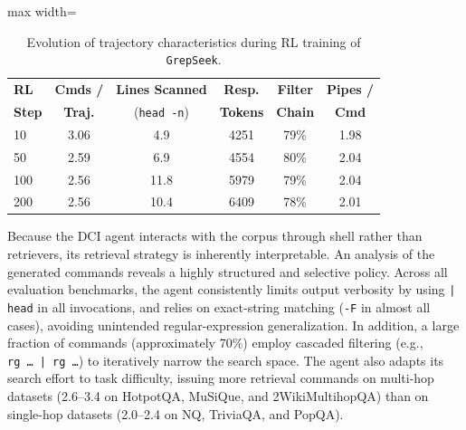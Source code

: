 \documentclass{article} %
\newcommand{\ourmethod}{\texttt{GrepSeek}\xspace}
\begin{document}
\begin{table}
\vspace{-0.8cm} %
\centering
\caption{Evolution of trajectory characteristics during RL training of \ourmethod{}. }
\small
\setlength{\tabcolsep}{2.5pt}
\begin{adjustbox}{max width=\linewidth}
\begin{tabular}{l c c c c c}
\toprule
\textbf{RL} & \textbf{Cmds /} & \textbf{Lines Scanned} & \textbf{Resp.} & \textbf{Filter} & \textbf{Pipes /}\\
\textbf{Step} & \textbf{Traj.} & (\texttt{head\,-n}) & \textbf{Tokens} & \textbf{Chain} & \textbf{Cmd}\\
\midrule
10  & 3.06 & 4.9  & 4251 & 79\% & 1.98\\
50  & 2.59 & 6.9  & 4554 & 80\% & 2.04\\
100 & 2.56 & 11.8 & 5979 & 79\% & 2.04\\
200 & 2.56 & 10.4 & 6409 & 78\% & 2.01\\
\bottomrule
\end{tabular}
\end{adjustbox}
\label{tab:cmd-evo}
\vspace{-0.3cm} %
\end{table}

Because the DCI agent interacts with the corpus through shell rather than retrievers, its retrieval strategy is inherently interpretable. An analysis of the generated commands reveals a highly structured and selective policy. Across all evaluation benchmarks, the agent consistently limits output verbosity by using \texttt{|\,head} in all invocations, and relies on exact-string matching (\texttt{-F} in almost all cases), avoiding unintended regular-expression generalization. In addition, a large fraction of commands (approximately 70\%) employ cascaded filtering (e.g., \texttt{rg\,\ldots\,|\,rg\,\ldots}) to iteratively narrow the search space. The agent also adapts its search effort to task difficulty, issuing more retrieval commands on multi-hop datasets (2.6--3.4 on HotpotQA, MuSiQue, and 2WikiMultihopQA) than on single-hop datasets (2.0--2.4 on NQ, TriviaQA, and PopQA).
\end{document}
